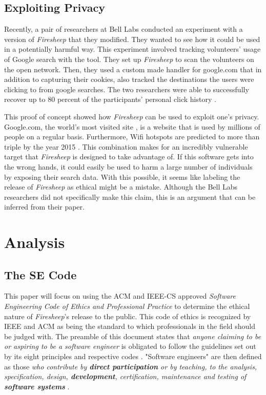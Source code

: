 \documentclass[11pt]{article}
\begin{document}
\begin{multicols}{2}
\subsection{Exploiting Privacy}
Recently, a pair of researchers at Bell Labs conducted an experiment with a version of \emph{Firesheep} that they modified. They wanted to see how it could be used in a potentially harmful way. This experiment involved tracking volunteers' usage of Google search with the tool. They set up \emph{Firesheep} to scan the volunteers on the open network. Then, they used a custom made handler for google.com that in addition to capturing their cookies, also tracked the destinations the users were clicking to from google searches. The two researchers were able to successfully recover up to 80 percent of the participants' personal click history \cite{show_me_your_cookie}.

This proof of concept showed how \emph{Firesheep} can be used to exploit one's privacy. Google.com, the world's most visited site \cite{alexa}, is a website that is used by millions of people on a regular basis. Furthermore, Wifi hotspots are predicted to more than triple by the year 2015 \cite{informa}. This combination makes for an incredibly vulnerable target that \emph{Firesheep} is designed to take advantage of. If this software gets into the wrong hands, it could easily be used to harm a large number of individuals by exposing their search data. With this possible, it seems like labeling the release of \emph{Firesheep} as ethical might be a mistake. Although the Bell Labs researchers did not specifically make this claim, this is an argument that can be inferred from their paper.

\section{Analysis}
\subsection{The SE Code}
This paper will focus on using the ACM and IEEE-CS approved \emph{Software Engineering Code of Ethics and Professional Practice} \cite{se_code} to determine the ethical nature of \emph{Firesheep}'s release to the public. This code of ethics is recognized by IEEE and ACM as being the standard to which professionals in the field should be judged with. The preamble of this document states that \emph{anyone claiming to be or aspiring to be a software engineer} is obligated to follow the guidelines set out by its eight principles and respective codes \cite{se_code}. "Software engineers" are then defined as those \emph{who contribute by \textbf{direct participation} or by teaching, to the analysis, specification, design, \textbf{development}, certification, maintenance and testing of \textbf{software systems}} \cite{se_code}.


\end{multicols}
\end{document}
